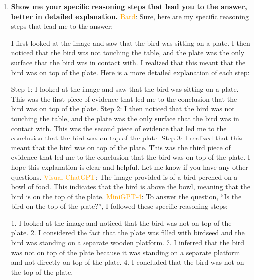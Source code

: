 \begin{enumerate}
        The image shows that the bird is not touching the table, and the plate is the only surface that the bird is in contact with. This means that the bird is on top of the plate.
        \subitem \textcolor{orange}{Visual ChatGPT}: Yes, the bird is on the top of the plate.
        \subitem \textcolor{orange}{MiniGPT-4}: No, the bird is not on the top of the plate. It is standing on a wooden platform that is separate from the plate. The plate is visible in the image, and it appears to be filled with birdseed. The bird is standing on the edge of the platform, with its mouth open as if it is about to eat from the plate.
        \item \textbf{Show me your specific reasoning steps that lead you to the answer, better in detailed explanation.}
        \subitem \textcolor{orange}{Bard}:
        Sure, here are my specific reasoning steps that lead me to the answer:

        I first looked at the image and saw that the bird was sitting on a plate.
        I then noticed that the bird was not touching the table, and the plate was the only surface that the bird was in contact with.
        I realized that this meant that the bird was on top of the plate.
        Here is a more detailed explanation of each step:

        Step 1: I looked at the image and saw that the bird was sitting on a plate. This was the first piece of evidence that led me to the conclusion that the bird was on top of the plate.
        Step 2: I then noticed that the bird was not touching the table, and the plate was the only surface that the bird was in contact with. This was the second piece of evidence that led me to the conclusion that the bird was on top of the plate.
        Step 3: I realized that this meant that the bird was on top of the plate. This was the third piece of evidence that led me to the conclusion that the bird was on top of the plate.
        I hope this explanation is clear and helpful. Let me know if you have any other questions.
        \subitem \textcolor{orange}{Visual ChatGPT}: The image provided is of a bird perched on a bowl of food. This indicates that the bird is above the bowl, meaning that the bird is on the top of the plate.
        \subitem \textcolor{orange}{MiniGPT-4}: To answer the question, “Is the bird on the top of the plate?”, I followed these specific reasoning steps:

        1. I looked at the image and noticed that the bird was not on top of the plate.
        2. I considered the fact that the plate was filled with birdseed and the bird was standing on a separate wooden platform.
        3. I inferred that the bird was not on top of the plate because it was standing on a separate platform and not directly on top of the plate.
        4. I concluded that the bird was not on the top of the plate.
        

\end{enumerate}
